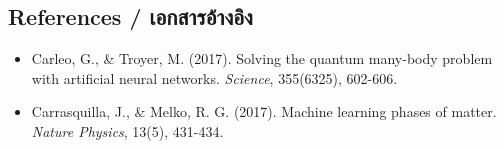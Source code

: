 \subsection{References \quad / \quad \textthai{เอกสารอ้างอิง}}
\begin{itemize}
    \item Carleo, G., \& Troyer, M. (2017). Solving the quantum many-body problem with artificial neural networks. \textit{Science}, 355(6325), 602-606.
    \item Carrasquilla, J., \& Melko, R. G. (2017). Machine learning phases of matter. \textit{Nature Physics}, 13(5), 431-434.
\end{itemize}
